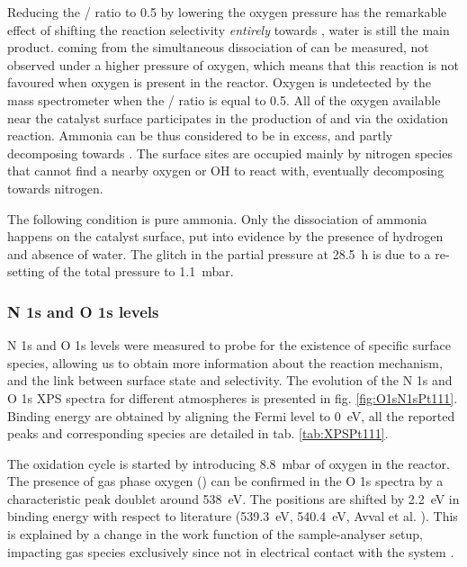Reducing the / ratio to \num{0.5} by lowering the oxygen pressure has the remarkable effect of shifting the reaction selectivity \textit{entirely} towards , water is still the main product.
 coming from the simultaneous dissociation of  can be measured, not observed under a higher pressure of oxygen, which means that this reaction is not favoured when oxygen is present in the reactor.
Oxygen is undetected by the mass spectrometer when the / ratio is equal to \num{0.5}.
All of the oxygen available near the catalyst surface participates in the production of  and  via the oxidation reaction.
Ammonia can be thus considered to be in excess, and partly decomposing towards .
The surface sites are occupied mainly by nitrogen species that cannot find a nearby oxygen or OH to react with, eventually decomposing towards nitrogen.

The following condition is pure ammonia.
Only the dissociation of ammonia happens on the catalyst surface, put into evidence by the presence of hydrogen and absence of water.
The glitch in the partial pressure at \qty{28.5}{\hour} is due to a re-setting of the total pressure to \qty{1.1}{\milli\bar}.

\subsubsection{N 1s and O 1s levels}

N 1s and O 1s levels were measured to probe for the existence of specific surface species, allowing us to obtain more information about the reaction mechanism, and the link between surface state and selectivity.
The evolution of the N 1s and O 1s XPS spectra for different atmospheres is presented in fig. \ref{fig:O1sN1sPt111}.
Binding energy are obtained by aligning the Fermi level to \qty{0}{\eV}, all the reported peaks and corresponding species are detailed in tab. \ref{tab:XPSPt111}.

The oxidation cycle is started by introducing \qty{8.8}{\milli\bar} of oxygen in the reactor.
The presence of gas phase oxygen () can be confirmed in the O 1s spectra by a characteristic peak doublet around \qty{538}{\eV}.
The positions are shifted by \qty{2.2}{\eV} in binding energy with respect to literature (\qty{539.3}{\eV}, \qty{540.4}{\eV}, Avval et al. \cite{Avval2022}).
This is explained by a change in the work function of the sample-analyser setup, impacting gas species exclusively since not in electrical contact with the system \parencite{Starr2021}.

